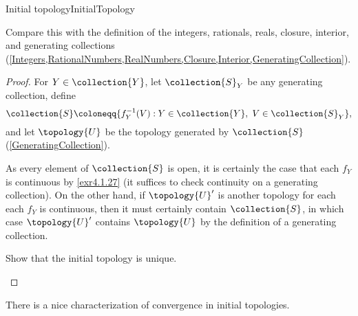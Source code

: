 \begin{prp}{Initial topology}{InitialTopology}
\begin{wrn}
\end{wrn}
\begin{rmk}
Compare this with the definition of the integers, rationals, reals, closure, interior, and generating collections (\cref{Integers,RationalNumbers,RealNumbers,Closure,Interior,GeneratingCollection}).
\end{rmk}
\begin{proof}
For $Y\in \collection{Y}$, let $\collection{S}_Y$ be any generating collection, define
\begin{equation}
\collection{S}\coloneqq \{ f_Y^{-1}(V):Y\in \collection{Y},\ V\in \collection{S}_Y\} ,
\end{equation}
and let $\topology{U}$ be the topology generated by $\collection{S}$ (\cref{GeneratingCollection}).

As every element of $\collection{S}$ is open, it is certainly the case that each $f_Y$ is continuous by \cref{exr4.1.27} (it suffices to check continuity on a generating collection).  On the other hand, if $\topology{U}'$ is another topology for each each $f_Y$ is continuous, then it must certainly contain $\collection{S}$, in which case $\topology{U}'$ contains $\topology{U}$ by the definition of a generating collection.

\begin{exr}[breakable=false]{}{}
Show that the initial topology is unique.
\end{exr}
\end{proof}
\end{prp}
There is a nice characterization of convergence in initial topologies.
